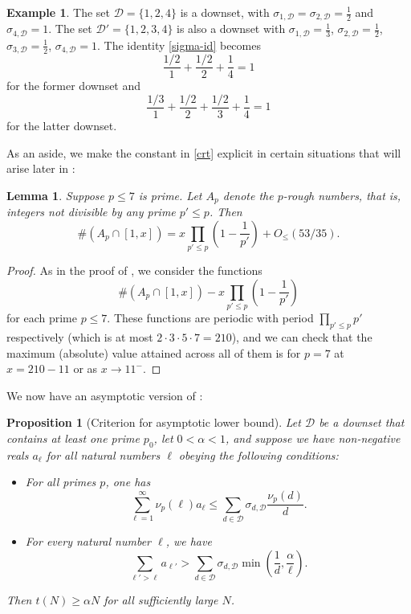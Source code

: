 \documentclass[12pt,a4paper,reqno]{amsart}
\numberwithin{equation}{section}
\theoremstyle{plain}
\newtheorem{proposition}[theorem]{Proposition}
\newtheorem{lemma}[theorem]{Lemma}
\theoremstyle{definition}
\newtheorem{example}[theorem]{Example}
\begin{document}
\begin{example}  The set ${\mathcal D} = \{1,2,4\}$ is a downset, with $\sigma_{1,{\mathcal D}} = \sigma_{2,{\mathcal D}} = \frac{1}{2}$ and $\sigma_{4,\mathcal D} = 1$.  The set ${\mathcal D}' = \{1,2,3,4\}$ is also a downset with $\sigma_{1,{\mathcal D}} = \frac{1}{3}$, $\sigma_{2,{\mathcal D}} = \frac{1}{2}$, $\sigma_{3,{\mathcal D}} = \frac{1}{2}$, $\sigma_{4,{\mathcal D}} = 1$.  The identity \eqref{sigma-id} becomes
$$ \frac{1/2}{1} + \frac{1/2}{2} + \frac{1}{4} = 1$$
for the former downset and
$$ \frac{1/3}{1} + \frac{1/2}{2} + \frac{1/2}{3} + \frac{1}{4} = 1$$
for the latter downset.
\end{example}

As an aside, we make the constant in \eqref{crt} explicit in certain situations that will arise later in :
\begin{lemma} \label{lit7}
  Suppose $p\le 7$ is prime.  Let $A_{p}$ denote the $p$-rough numbers, that is, integers not divisible by any prime $p'\le p$.  Then
  $$ \#(A_{p}\cap[1,x]) = x\prod_{p'\le p} \left(1-\frac{1}{p'}\right) + O_{\le}(53/35). $$
\end{lemma}
\begin{proof}
  As in the proof of , we consider the functions $$\#(A_{p}\cap[1,x]) - x\prod_{p'\le p} \left(1-\frac{1}{p'}\right)$$
  for each prime $p\le 7$.
  These functions are periodic with period $\prod_{p'\le p} p'$ respectively (which is at most $2\cdot 3\cdot 5\cdot 7=210$), and we can check that the maximum (absolute) value attained across all of them is for $p=7$ at $x=210-11$ or as $x\to 11^{-}$.
\end{proof}

We now have an asymptotic version of :

\begin{proposition}[Criterion for asymptotic lower bound]\label{asym-crit}  Let ${\mathcal D}$ be a downset that contains at least one prime $p_0$, let $0  < \alpha < 1$, and suppose we have non-negative reals $a_\ell$ for all natural numbers $\ell$ obeying the following conditions:
\begin{itemize}
\item[(i)]  For all primes $p$, one has
\begin{equation}\label{i-eq}
   \sum_{\ell=1}^\infty \nu_p(\ell) a_\ell  \leq \sum_{d \in {\mathcal D}} \sigma_{d,{\mathcal D}} \frac{\nu_p(d)}{d}.
\end{equation}
\item[(ii)]  For every natural number $\ell$, we have
\begin{equation}\label{l-eq} \sum_{\ell' > \ell} a_{\ell'} > \sum_{d \in {\mathcal D}} \sigma_{d,{\mathcal D}} \min\left( \frac{1}{d}, \frac{\alpha}{\ell}\right).
\end{equation}
\end{itemize}
Then $t(N) \geq \alpha N$ for all sufficiently large $N$.
\end{proposition}
\end{document}
